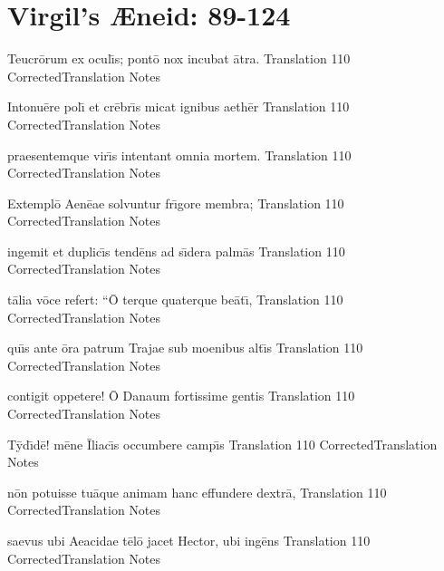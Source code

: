 \newpage
\section{Virgil's {\AE}neid:  89-124} %


\latline
  {Teucr\={\macron o}rum ex ocul\={\macron \i}s; pont\={\macron o} nox incubat \={\macron a}tra.}
  { Translation }
  {110}
  { CorrectedTranslation }
  { Notes }


\latline
  {Intonu\={\macron e}re pol\={\macron \i} et cr\={\macron e}br\={\macron \i}s micat ignibus aeth\={\macron e}r}
  { Translation }
  {110}
  { CorrectedTranslation }
  { Notes }


\latline
  {praesentemque vir\={\macron \i}s intentant omnia mortem.}
  { Translation }
  {110}
  { CorrectedTranslation }
  { Notes }


\newpage

\latline
  {Extempl\={\macron o} Aen\={\macron e}ae solvuntur fr\={\macron \i}gore membra;}
  { Translation }
  {110}
  { CorrectedTranslation }
  { Notes }


\latline
  {ingemit et duplic\={\macron \i}s tend\={\macron e}ns ad s\={\macron \i}dera palm\={\macron a}s}
  { Translation }
  {110}
  { CorrectedTranslation }
  { Notes }


\latline
  {t\={\macron a}lia v\={\macron o}ce refert:  ``\={\macron O} terque quaterque be\={\macron a}t\={\macron \i},}
  { Translation }
  {110}
  { CorrectedTranslation }
  { Notes }


\newpage

\latline
  {qu\={\macron \i}s ante \={\macron o}ra patrum Trajae sub moenibus alt\={\macron \i}s}
  { Translation }
  {110}
  { CorrectedTranslation }
  { Notes }


\latline
  {contigit oppetere!  \={\macron O} Danaum fortissime gentis}
  { Translation }
  {110}
  { CorrectedTranslation }
  { Notes }


\latline
  {T\={\macron y}d\={\macron \i}d\={\macron e}!  m\={\macron e}ne \={\macron I}liac\={\macron \i}s occumbere camp\={\macron \i}s}
  { Translation }
  {110}
  { CorrectedTranslation }
  { Notes }


\newpage

\latline
  {n\={\macron o}n potuisse tu\={\macron a}que animam hanc effundere dextr\={\macron a},}
  { Translation }
  {110}
  { CorrectedTranslation }
  { Notes }


\latline
  {saevus ubi Aeacidae t\={\macron e}l\={\macron o} jacet Hector, ubi ing\={\macron e}ns}
  { Translation }
  {110}
  { CorrectedTranslation }
  { Notes }


